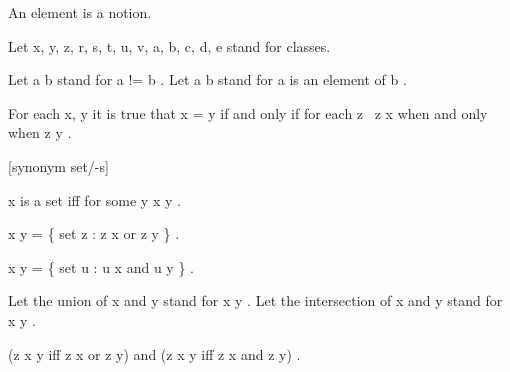 \documentclass[a4paper,draft]{amsproc}
\begin{document}
\begin{forthel}

\begin{signature}[ElmSort]
An element is a notion.
\end{signature}


Let  x, y, z, r, s, t, u, v, a, b, c, d, e  stand for classes.

Let  a \neq b  stand for  a  !=  b .
Let  a \in b  stand for  a  is an element of  b .

\begin{axiom} For each  x, y   
it is true that  x = y  if and only if for each  z \  z \in x  
when and only when  z \in y .
\end{axiom}


[synonym set/-s]

\begin{definition} 
 x  is a set iff for some  y   x \in y .
\end{definition}


\begin{definition} 
 x \cup y = \{ set  z : z \in x  or  z \in y \} .
\end{definition}

\begin{definition} 
 x \cap y = \{ set  u : u \in x  and  u \in y \} .
\end{definition}

Let the union of  x  and  y  stand for  x \cup y .
Let the intersection of  x  and  y  stand for  x \cap y .

\begin{theorem}
 (z \in x \cup y  iff  z \in x  or  z \in y) 
and  (z \in x \cap y  iff  z \in x  and  z \in y) .
\end{theorem}


\end{forthel}
\end{document}
